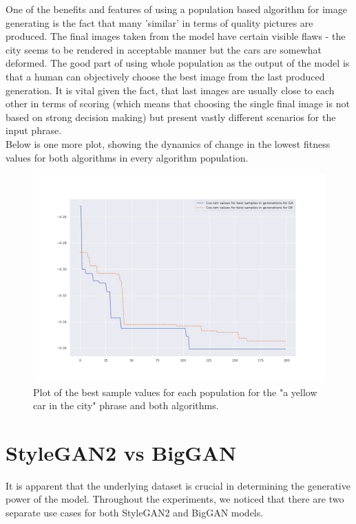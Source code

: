 \documentclass[12pt,a4paper,openany]{book}
\begin{document}
\noindent One of the benefits and features of using a population based algorithm for image generating is the fact that many 'similar' in terms of quality pictures are produced. The final images taken from the model have certain visible flaws - the city seems to be rendered in acceptable manner but the cars are somewhat deformed. The good part of using whole population as the output of the model is that a human can objectively choose the best image from the last produced generation. It is vital given the fact, that last images are usually close to each other in terms of scoring (which means that choosing the single final image is not based on strong decision making) but present vastly different scenarios for the input phrase.\\

\noindent Below is one more plot, showing the dynamics of change in the lowest fitness values for both algorithms in every algorithm population.

\begin{figure}[H]
    \centering
    \includegraphics[scale=0.45]{figs/best_both.jpg}
    \caption{Plot of the best sample values for each population for the "a yellow car in the city" phrase and both algorithms.}\label{Fig:STYLEGAN}
\end{figure}

\section{StyleGAN2 vs BigGAN}

\noindent It is apparent that the underlying dataset is crucial in determining the generative power of the model. Throughout the experiments, we noticed that there are two separate use cases for both StyleGAN2 and BigGAN models. 
\end{document}
